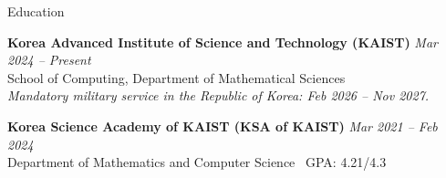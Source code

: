 \documentclass{resume}
\begin{document}
\small
\setlength{\parskip}{4pt}

\begin{rSection}{Education}

\textbf{Korea Advanced Institute of Science and Technology (KAIST)} \hfill \textit{Mar 2024 -- Present}\\
School of Computing, Department of Mathematical Sciences\\
\hspace*{1em}\textit{Mandatory military service in the Republic of Korea: Feb 2026 -- Nov 2027.}

\textbf{Korea Science Academy of KAIST (KSA of KAIST)} \hfill \textit{Mar 2021 -- Feb 2024}\\
Department of Mathematics and Computer Science \textperiodcentered\ GPA: 4.21/4.3

\end{rSection}
\end{document}
